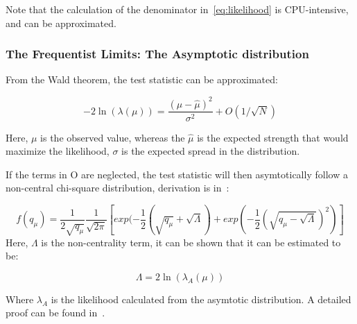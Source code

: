 Note that the calculation of the denominator in~\ref{eq:likelihood} is CPU-intensive, and can be approximated.


\subsubsection{The Frequentist Limits: The Asymptotic distribution}
\label{sec:asymp}


From the Wald theorem, the test statistic can be approximated: 

\begin{equation}
-2\ln(\lambda(\mu))= \frac{(\mu- \hat{\mu})^{2}}{\sigma^{2}} +O(1/\sqrt{N})
\label{eq:wald}
\end{equation}

Here, $\mu$ is the observed value, whereas the $\hat{\mu}$ is the expected strength that would maximize the likelihood, $\sigma$ is the expected spread in the distribution. 

If the terms in O are neglected, the test statistic will then asymtotically follow a non-central chi-square distribution, derivation is in~\cite{2011}: 

\begin{equation}
    f(q_{\mu}) = \frac{1}{2\sqrt{q_{\mu}}} \frac{1}{\sqrt{2\pi}} [exp(-\frac{1}{2}(\sqrt{q_{\mu}}+ \sqrt{\Lambda})+ exp(-\frac{1}{2}(\sqrt{q_{\mu}-\sqrt{\Lambda}})^{2})]
\end{equation}
Here, $\Lambda$ is the non-centrality term, it can be shown that it can be estimated to be:

\begin{equation}
    \Lambda=2\ln(\lambda_{A}(\mu))
    \label{eq:Lambda}
\end{equation}

Where $\lambda_{A}$ is the likelihood calculated from the asymtotic distribution. A detailed proof can be found in~\cite{2011}. 










